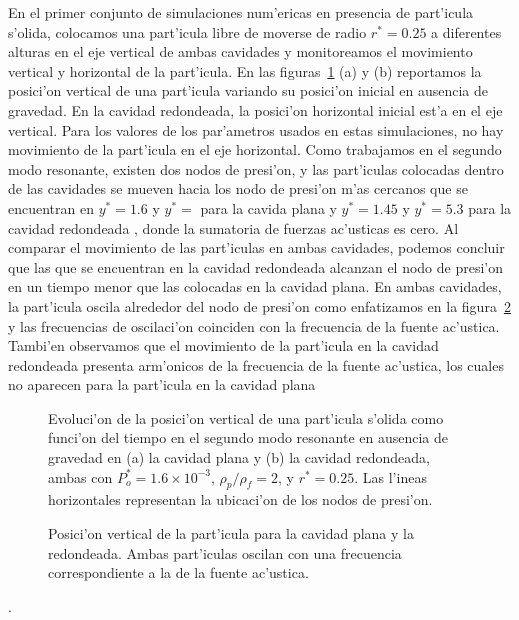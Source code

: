 En el primer conjunto de simulaciones num'ericas en presencia de part'icula s'olida,
colocamos una part'icula  libre de moverse de radio $r^\ast =0.25$  a diferentes alturas en el eje vertical de
ambas cavidades y monitoreamos el movimiento vertical y horizontal de la part'icula.  
En las figuras~\ref{fig:y-g-0} (a) y (b) reportamos la posici'on vertical de una part'icula variando
su posici'on inicial en ausencia de gravedad. En la cavidad redondeada, la posici'on horizontal inicial
est'a en el eje vertical. Para los valores de los par'ametros usados en estas simulaciones, no 
hay movimiento de la part'icula en el eje horizontal.
Como trabajamos en el segundo modo resonante, existen dos nodos de presi'on,
y las part'iculas colocadas dentro de las cavidades se mueven hacia los nodo de presi'on m'as cercanos
que se encuentran en $y^\ast = 1.6$ y $y^\ast = $ para la cavida plana y $y^\ast =1.45$ y $y^\ast =5.3$ para la
cavidad redondeada , donde la sumatoria de fuerzas ac'usticas es cero. Al comparar el movimiento de las part'iculas en ambas cavidades,
podemos concluir que las que se encuentran en la cavidad redondeada alcanzan el nodo de presi'on en un tiempo
menor que las colocadas en la cavidad plana.
En ambas cavidades, la part'icula oscila alrededor del nodo de presi'on como enfatizamos en la 
figura~\ref{fig:detalle-flat-rounded} y las frecuencias de oscilaci'on coinciden con la frecuencia de la fuente ac'ustica.
Tambi'en observamos que el movimiento de la part'icula en la cavidad redondeada presenta arm'onicos
de la frecuencia de la fuente ac'ustica, los cuales no aparecen para la part'icula en la cavidad plana
\begin{figure} 


\vskip 5mm
\caption{\label{fig:y-g-0}
Evoluci'on de la posici'on vertical de una part'icula s'olida como funci'on del tiempo
en el segundo modo resonante en ausencia de gravedad en (a) la cavidad  plana y (b) la
cavidad  redondeada, ambas con  $P_o^\ast = 1.6\times 10^{-3}$, $\rho_p/\rho_f=2$, y $r^\ast=0.25$.
Las l'ineas horizontales representan la ubicaci'on de los nodos de presi'on. 
}
\end{figure}
\begin{figure} 

%
\caption{\label{fig:detalle-flat-rounded}
Posici'on vertical de la part'icula para  la cavidad
plana y la redondeada. Ambas part'iculas oscilan con una frecuencia correspondiente
a la de la fuente ac'ustica.
}
\end{figure}.

